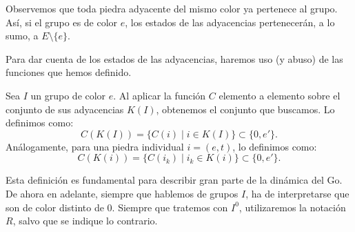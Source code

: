 Observemos que toda piedra adyacente del mismo color ya pertenece al grupo. Así, si el grupo es de color $e$, los estados de las adyacencias pertenecerán, a lo sumo, a $E\setminus\{e\}$.

Para dar cuenta de los estados de las adyacencias, haremos uso (y abuso) de las funciones que hemos definido.

\begin{definition}\label{def_estados}
	Sea $I$ un grupo de color $e$. Al aplicar la función $C$ elemento a elemento sobre el conjunto de sus adyacencias $K(I)$, obtenemos el conjunto que buscamos. Lo definimos como:
	\[C(K(I)) = \{C(i) \mid   i\in K(I)\} \subset \{0, e'\}.\]
	Análogamente, para una piedra individual $i = (e,t)$, lo definimos como:
	\[C(K(i)) = \{C(i_k) \mid i_k \in K(i)\} \subset \{0, e'\}.\]
\end{definition}
Esta definición es fundamental para describir gran parte de la dinámica del Go. De ahora en adelante, siempre que hablemos de grupos $I$, ha de interpretarse que son de color distinto de $0$. Siempre que tratemos con $I^{0}$, utilizaremos la notación $R$, salvo que se indique lo contrario.

